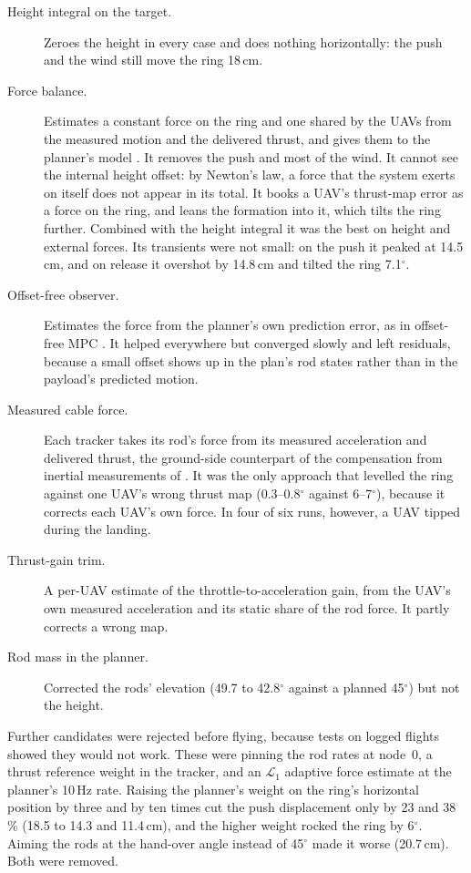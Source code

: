 \begin{description}
    \item[Height integral on the target.] Zeroes the height in every case and does nothing
    horizontally: the push and the wind still move the ring 18\,cm.
    \item[Force balance.] Estimates a constant force on the ring and one shared by the UAVs from
    the measured motion and the delivered thrust, and gives them to the planner's model
    \cite{muske2002disturbance}. It removes the push and most of the wind. It cannot see the internal
    height offset: by Newton's law, a force that the system exerts on itself does not appear in its
    total. It books a UAV's thrust-map error as a force on the ring, and leans the formation into
    it, which tilts the ring further. Combined with the height integral it was the best on height and
    external forces. Its transients were not small: on the push it peaked at 14.5\,cm, and on release
    it overshot by 14.8\,cm and tilted the ring 7.1$^\circ$.
    \item[Offset-free observer.] Estimates the force from the planner's own prediction error, as in
    offset-free MPC \cite{pannocchia2003disturbance}. It helped everywhere but converged slowly and left
    residuals, because a small offset shows up in the plan's rod states rather than in the payload's
    predicted motion.
    \item[Measured cable force.] Each tracker takes its rod's force from its measured acceleration
    and delivered thrust, the ground-side counterpart of the compensation from inertial measurements of
    \cite{tudelft}. It was the only approach that levelled the ring against one UAV's wrong thrust
    map (0.3--0.8$^\circ$ against 6--7$^\circ$), because it corrects each UAV's own force. In four of
    six runs, however, a UAV tipped during the landing.
    \item[Thrust-gain trim.] A per-UAV estimate of the throttle-to-acceleration gain, from the UAV's
    own measured acceleration and its static share of the rod force. It partly corrects a wrong map.
    \item[Rod mass in the planner.] Corrected the rods' elevation (49.7 to 42.8$^\circ$ against a planned
    45$^\circ$) but not the height.
\end{description}
Further candidates were rejected before flying, because tests on logged flights showed they would
not work. These were pinning the rod rates at node~0, a thrust reference weight in the
tracker, and an $\mathcal{L}_1$ adaptive force estimate \cite{hovakimyan2010l1} at the planner's
10\,Hz rate. Raising the planner's weight on the ring's horizontal position by three and by ten times
cut the push displacement only by 23 and 38\,\% (18.5 to 14.3 and 11.4\,cm), and the higher weight
rocked the ring by 6$^\circ$. Aiming the rods at the hand-over angle instead of 45$^\circ$ made it
worse (20.7\,cm). Both were removed.

